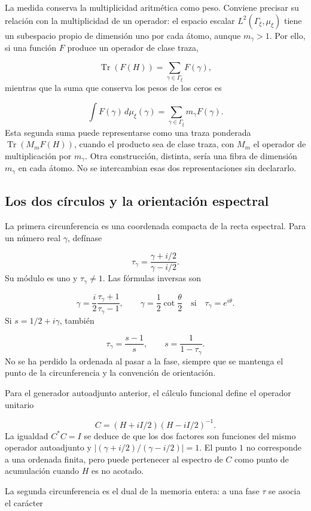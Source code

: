 La medida conserva la multiplicidad aritmética como peso. Conviene precisar su relación con la multiplicidad de un operador: el espacio escalar \(L^2(\Gamma_\xi,\mu_\xi)\) tiene un subespacio propio de dimensión uno por cada átomo, aunque \(m_\gamma>1\). Por ello, si una función \(F\) produce un operador de clase traza,

\[
\operatorname{Tr}(F(H))=\sum_{\gamma\in\Gamma_\xi}F(\gamma),
\]
mientras que la suma que conserva los pesos de los ceros es

\[
\int F(\gamma)\,d\mu_\xi(\gamma)
=\sum_{\gamma\in\Gamma_\xi}m_\gamma F(\gamma).
\]
Esta segunda suma puede representarse como una traza ponderada \(\operatorname{Tr}(M_mF(H))\), cuando el producto sea de clase traza, con \(M_m\) el operador de multiplicación por \(m_\gamma\). Otra construcción, distinta, sería una fibra de dimensión \(m_\gamma\) en cada átomo. No se intercambian esas dos representaciones sin declararlo.

\subsection{Los dos círculos y la orientación espectral}
La primera circunferencia es una coordenada compacta de la recta espectral. Para un número real \(\gamma\), defínase

\[
\tau_\gamma=\frac{\gamma+i/2}{\gamma-i/2}.
\]
Su módulo es uno y \(\tau_\gamma\neq1\). Las fórmulas inversas son

\[
\gamma=\frac{i}{2}\frac{\tau_\gamma+1}{\tau_\gamma-1},
\qquad
\gamma=\frac12\cot\frac{\theta}{2}
\quad\text{si}\quad\tau_\gamma=e^{i\theta}.
\]
Si \(s=1/2+i\gamma\), también

\[
\tau_\gamma=\frac{s-1}{s},\qquad s=\frac1{1-\tau_\gamma}.
\]
No se ha perdido la ordenada al pasar a la fase, siempre que se mantenga el punto de la circunferencia y la convención de orientación.

Para el generador autoadjunto anterior, el cálculo funcional define el operador unitario

\[
C=(H+iI/2)(H-iI/2)^{-1}.
\]
La igualdad \(C^*C=I\) se deduce de que los dos factores son funciones del mismo operador autoadjunto y \(|(\gamma+i/2)/(\gamma-i/2)|=1\). El punto \(1\) no corresponde a una ordenada finita, pero puede pertenecer al espectro de \(C\) como punto de acumulación cuando \(H\) es no acotado.

La segunda circunferencia es el dual de la memoria entera: a una fase \(\tau\) se asocia el carácter

